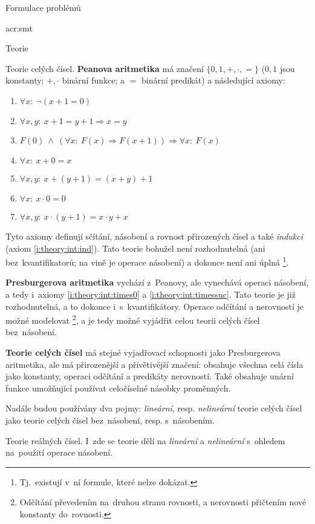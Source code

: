 \documentclass[thesis=M,czech]{FITthesis}[2012/06/26]
\newcommand{\acrlabel}[1]{acr:#1}
\newcommand{\acrf}[1]{\acrfull{\acrlabel{#1}}}
\newcommand{\hl}[1]{\textit{#1}}
\newcommand{\hll}[1]{\textbf{#1}}
\newcommand{\name}[1]{\hl{#1}}
\newcommand{\rf}[1]{\ref{#1}}
\begin{document}
\begin{section}{Formulace problémů}
\begin{subsection}{\acrf{smt}}
\begin{subsubsection}{Teorie}
\begin{paragraph}{Teorie celých čísel.}
\hll{Peanova aritmetika} má značení
$\{ {0, 1}, {+, \cdot}, = \}$
(${0,1}$ jsou konstanty;
${+,\cdot}$ binární funkce;
a $=$ binární predikát)
a následující axiomy:
\begin{enumerate}
\item $\forall x : \: \neg ( x + 1 = 0 )$
\item $\forall x,y : \: x+1 = y+1 \Rightarrow x = y$
\item \label{i:theory:int:ind}
   $F(0) \: \land \: \left( \forall x : \: F(x) \Rightarrow F(x+1) \right)
      \Rightarrow \forall x : \: F(x)$
\item $\forall x : \: x+0 = x$
\item $\forall x,y : \: x + (y+1) = (x+y) + 1$
\item \label{i:theory:int:times0}
   $\forall x : \: x \cdot 0 = 0$
\item \label{i:theory:int:timessuc}
   $\forall x,y : \: x \cdot (y+1) = x \cdot y + x$
\end{enumerate}
Tyto axiomy definují sčítání, násobení a rovnost
přirozených čísel a také \name{indukci}
(axiom \rf{i:theory:int:ind}).
Tato teorie bohužel není rozhodnutelná
(ani bez~kvantifikatorů;
na vině je operace násobení)
a dokonce není ani úplná%
\footnote{Tj.~existují v~ní formule, které nelze dokázat.}.

\hll{Presburgerova aritmetika} vychází z~Peanovy,
ale vynechává operaci násobení,
a tedy i~axiomy \rf{i:theory:int:times0} a \rf{i:theory:int:timessuc}.
Tato teorie je již rozhodnutelná,
a to dokonce i~s~kvantifikátory.
Operace odčítání a nerovností je možné modelovat%
\footnote{Odčítání převedením na~druhou stranu rovnosti,
a nerovnosti přičtením nové konstanty do~rovnosti.},
a je tedy možné vyjádřit celou teorii celých čísel
bez~násobení.

\hll{Teorie celých čísel} má stejné vyjadřovací schopnosti
jako Presburgerova aritmetika,
ale má přirozenější a přívětivější značení:
obsahuje všechna celá čísla jako konstanty,
operaci odčítání a predikáty nerovností.
Také obsahuje unární funkce
umožňující používat celočíselné násobky proměnných.

Nadále budou používány dva pojmy:
\hl{lineární}, resp. \hl{nelineární}
teorie celých čísel
jako teorie celých čísel bez~násobení,
resp. s~násobením.
\end{paragraph} %


\begin{paragraph}{Teorie reálných čísel.}
\label{p:theory:formulation:smt:theory:real}
I~zde se teorie dělí na \hl{lineární} a \hl{nelineární}
s~ohledem na~použití operace násobení.


\end{paragraph}
\end{subsubsection}
\end{subsection}
\end{section}
\end{document}
